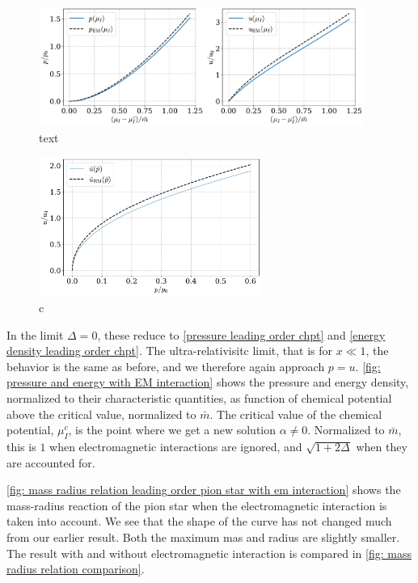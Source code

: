 \begin{figure}[!htb]
    \centering
    \includegraphics[width=0.95\textwidth]{../scripts/figurer/pion_star/pion_tree_up.pdf}
    \caption{text
        }
        \label{fig: pressure and energy with EM interaction}
\end{figure}



\begin{figure}[!htb]
    \centering
    \includegraphics[width=0.65\textwidth]{../scripts/figurer/pion_star/pion_tree_eos_EM.pdf}
    \caption{c}
    \label{fig: eos chpt em interaction}
\end{figure}

In the limit $\Delta = 0$, these reduce to \autoref{pressure leading order chpt} and \autoref{energy density leading order chpt}.
The ultra-relativisitc limit, that is for  $x \ll 1$, the behavior is the same as before, and we therefore again approach $p = u$.
\autoref{fig: pressure and energy with EM interaction} shows the pressure and energy density, normalized to their characteristic quantities, as function of chemical potential above the critical value, normalized to $\bar m$.
The critical value of the chemical potential, $\mu_I^c$, is the point where we get a new solution $\alpha\neq 0$.
Normalized to $\bar m$, this is $1$ when electromagnetic interactions are ignored, and $\sqrt{1 + 2 \Delta}$ when they are accounted for.



\autoref{fig: mass radius relation leading order pion star with em interaction} shows the mass-radius reaction of the pion star when the electromagnetic interaction is taken into account.
We see that the shape of the curve has not changed much from our earlier result. 
Both the maximum mas and radius are slightly smaller.
The result with and without electromagnetic interaction is compared in \autoref{fig: mass radius relation comparison}.


